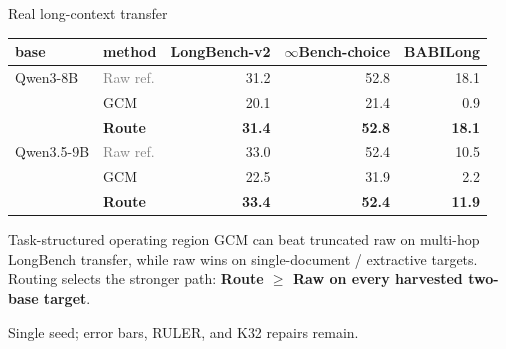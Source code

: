 \begin{frame}{Real long-context transfer}
  \centering\scriptsize
  \begin{tabular}{llrrr}
  \toprule
  base & method & LongBench-v2 & $\infty$Bench-choice & BABILong \\
  \midrule
  Qwen3-8B & \textcolor{gray}{Raw ref.} & 31.2 & 52.8 & 18.1 \\
            & GCM & 20.1 & 21.4 & 0.9 \\
            & \textbf{Route} & \textbf{31.4} & \textbf{52.8} & \textbf{18.1} \\
  Qwen3.5-9B & \textcolor{gray}{Raw ref.} & 33.0 & 52.4 & 10.5 \\
              & GCM & 22.5 & 31.9 & 2.2 \\
              & \textbf{Route} & \textbf{33.4} & \textbf{52.4} & \textbf{11.9} \\
  \bottomrule
  \end{tabular}
  \vspace{0.45em}
  \begin{block}{Task-structured operating region}
    \footnotesize GCM can beat truncated raw on multi-hop LongBench transfer, while raw wins on
    single-document / extractive targets. Routing selects the stronger path:
    \textbf{Route $\ge$ Raw on every harvested two-base target}.
  \end{block}
  \footnotesize Single seed; error bars, RULER, and K32 repairs remain.
\end{frame}

